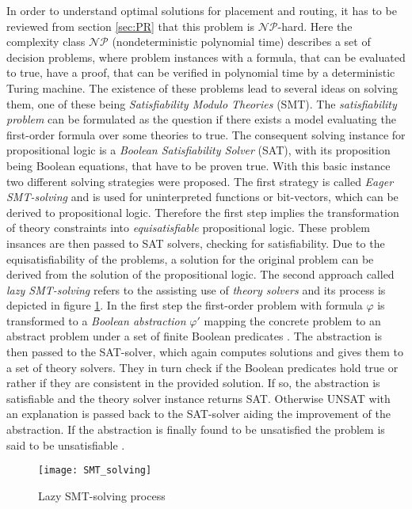 In order to understand optimal solutions for placement and routing, it has to be reviewed from section \ref{sec:PR} that this problem is $\mathcal{NP}$-hard. Here the complexity class $\mathcal{NP}$ (nondeterministic polynomial time) describes a set of decision problems, where problem instances with a formula, that can be evaluated to true, have a proof, that can be verified in polynomial time by a deterministic Turing machine. The existence of these problems lead to several ideas on solving them, one of these being \textit{Satisfiability Modulo Theories} (SMT). The \textit{satisfiability problem} can be formulated as the question if there exists a model evaluating the first-order formula over some theories to true. The consequent solving instance for propositional logic is a \textit{Boolean Satisfiability Solver} (SAT), with its proposition being Boolean equations, that have to be proven true. With this basic instance two different solving strategies were proposed. The first strategy is called \textit{Eager SMT-solving} and is used for uninterpreted functions or bit-vectors, which can be derived to propositional logic. Therefore the first step implies the transformation of theory constraints into \textit{equisatisfiable} propositional logic. These problem insances are then passed to SAT solvers, checking for satisfiability. Due to the equisatisfiability of the problems, a solution for the original problem can be derived from the solution of the propositional logic. The second approach called \textit{lazy SMT-solving} refers to the assisting use of \textit{theory solvers} and its process is depicted in figure \ref{fig:SMT_solving}. In the first step the first-order problem with formula $\varphi$ is transformed to a \textit{Boolean abstraction} $\varphi'$ mapping the concrete problem to an abstract problem under a set of finite Boolean predicates \cite{boolean_abstraction}. The abstraction is then passed to the SAT-solver, which again computes solutions and gives them to a set of theory solvers. They in turn check if the Boolean predicates hold true or rather if they are consistent in the provided solution. If so, the abstraction is satisfiable and the theory solver instance returns SAT. Otherwise UNSAT with an explanation is passed back to the SAT-solver aiding the improvement of the abstraction. If the abstraction is finally found to be unsatisfied the problem is said to be unsatisfiable \cite{SMT}.

\begin{figure}
	\centering
	\texttt{[image: SMT\_solving]}
	\caption{Lazy SMT-solving  process \cite{SMT}}\label{fig:SMT_solving}
\end{figure}

